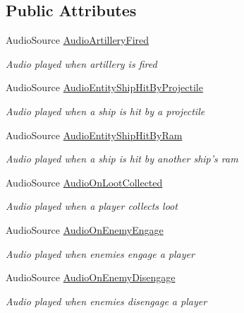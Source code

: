 \subsection*{Public Attributes}
\begin{DoxyCompactItemize}
\item 
Audio\-Source \hyperlink{class_skyrates_1_1_client_1_1_audio_dispatcher_ad996cff373d93efc72d30948bf5a30d7}{Audio\-Artillery\-Fired}
\begin{DoxyCompactList}\small\item\em Audio played when artillery is fired \end{DoxyCompactList}\item 
Audio\-Source \hyperlink{class_skyrates_1_1_client_1_1_audio_dispatcher_a3bcd016090038e5f09c8735ad5cba131}{Audio\-Entity\-Ship\-Hit\-By\-Projectile}
\begin{DoxyCompactList}\small\item\em Audio played when a ship is hit by a projectile \end{DoxyCompactList}\item 
Audio\-Source \hyperlink{class_skyrates_1_1_client_1_1_audio_dispatcher_a67abfa1ba1df41fd20457865b10b9a4a}{Audio\-Entity\-Ship\-Hit\-By\-Ram}
\begin{DoxyCompactList}\small\item\em Audio played when a ship is hit by another ship's ram \end{DoxyCompactList}\item 
Audio\-Source \hyperlink{class_skyrates_1_1_client_1_1_audio_dispatcher_ab8a146c252b56f67a02579b6b65bc299}{Audio\-On\-Loot\-Collected}
\begin{DoxyCompactList}\small\item\em Audio played when a player collects loot \end{DoxyCompactList}\item 
Audio\-Source \hyperlink{class_skyrates_1_1_client_1_1_audio_dispatcher_a2f4d4827e4638cf83404fc4f557bfef5}{Audio\-On\-Enemy\-Engage}
\begin{DoxyCompactList}\small\item\em Audio played when enemies engage a player \end{DoxyCompactList}\item 
Audio\-Source \hyperlink{class_skyrates_1_1_client_1_1_audio_dispatcher_a12f9d81e7271cf0dae71482611df8e03}{Audio\-On\-Enemy\-Disengage}
\begin{DoxyCompactList}\small\item\em Audio played when enemies disengage a player \end{DoxyCompactList}\end{DoxyCompactItemize}


